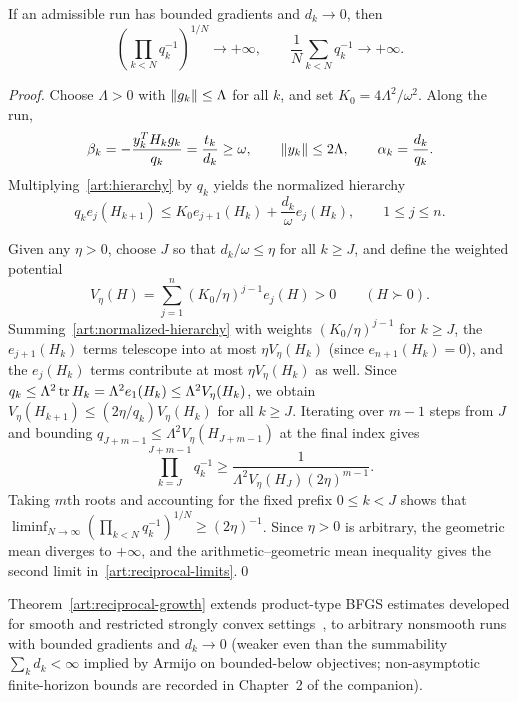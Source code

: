 \begin{theorem}\label{art:reciprocal-growth}
If an admissible run has bounded gradients and $d_k\to0$, then
\begin{equation}\label{art:reciprocal-limits}
 \left(\prod_{k<N}q_k^{-1}\right)^{1/N}\longrightarrow+\infty,
 \qquad \frac1N\sum_{k<N}q_k^{-1}\longrightarrow+\infty.
\end{equation}
\end{theorem}
\begin{proof}
Choose $\Lambda>0$ with $\lVert g_k\rVert\le\Lambda$ for all $k$, and set
$K_0=4\Lambda^2/\omega^2$. Along the run,
\[
 \beta_k=-\frac{y_k^TH_kg_k}{q_k}=\frac{t_k}{d_k}\ge\omega,\qquad
 \lVert y_k\rVert\le2\Lambda,\qquad \alpha_k=\frac{d_k}{q_k}.
\]
Multiplying~\eqref{art:hierarchy} by $q_k$ yields the normalized hierarchy
\begin{equation}\label{art:normalized-hierarchy}
 q_ke_j(H_{k+1})\le
 K_0e_{j+1}(H_k)+\frac{d_k}{\omega}e_j(H_k),\qquad 1\le j\le n.
\end{equation}

Given any $\eta>0$, choose $J$ so that $d_k/\omega\le\eta$ for all $k\ge J$, and
define the weighted potential
\[
 V_\eta(H)=\sum_{j=1}^n(K_0/\eta)^{j-1}e_j(H)>0\qquad(H\succ0).
\]
Summing~\eqref{art:normalized-hierarchy} with weights $(K_0/\eta)^{j-1}$ for
$k\ge J$, the $e_{j+1}(H_k)$ terms telescope into at most $\eta V_\eta(H_k)$
(since $e_{n+1}(H_k)=0$), and the $e_j(H_k)$ terms contribute at most
$\eta V_\eta(H_k)$ as well. Since $q_k\le\Lambda^2\operatorname{tr} H_k=\Lambda^2e_1(H_k)\le\Lambda^2V_\eta(H_k)$,
we obtain $V_\eta(H_{k+1})\le(2\eta/q_k)V_\eta(H_k)$ for all $k\ge J$. Iterating
over $m-1$ steps from $J$ and bounding $q_{J+m-1}\le\Lambda^2V_\eta(H_{J+m-1})$
at the final index gives
\[
 \prod_{k=J}^{J+m-1}q_k^{-1}
 \ge\frac{1}{\Lambda^2V_\eta(H_J)(2\eta)^{m-1}}.
\]
Taking $m$th roots and accounting for the fixed prefix $0\le k<J$ shows that
$\liminf_{N\to\infty}(\prod_{k<N}q_k^{-1})^{1/N}\ge(2\eta)^{-1}$. Since $\eta>0$
is arbitrary, the geometric mean diverges to $+\infty$, and the arithmetic--geometric
mean inequality gives the second limit in~\eqref{art:reciprocal-limits}.\qed
\end{proof}

Theorem~\ref{art:reciprocal-growth} extends product-type BFGS estimates
developed for smooth and restricted strongly convex
settings~\cite[Theorem~3.7]{S16}, \cite[Appendices~C--D]{FND_JJM24AW} to
arbitrary nonsmooth runs with bounded gradients and $d_k\to0$ (weaker even than
the summability $\sum_kd_k<\infty$ implied by Armijo on bounded-below
objectives; non-asymptotic finite-horizon bounds are recorded in Chapter~2 of
the companion).

